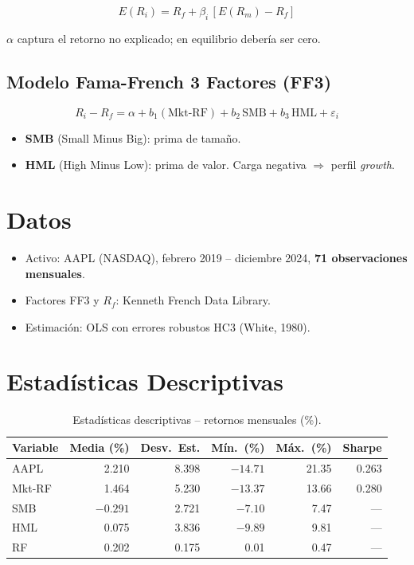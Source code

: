 \documentclass[12pt,letterpaper]{article}
\begin{document}
\begin{equation}
  E(R_i) = R_f + \beta_i\,[E(R_m) - R_f]
\end{equation}

$\alpha$ captura el retorno no explicado; en equilibrio deber\'ia ser cero.

\subsection{Modelo Fama-French 3 Factores (FF3)}

\begin{equation}
  R_i - R_f = \alpha + b_1(\text{Mkt-RF}) + b_2\,\text{SMB}
    + b_3\,\text{HML} + \varepsilon_i
\end{equation}

\begin{itemize}
  \item \textbf{SMB} (Small Minus Big): prima de tama\~no.
  \item \textbf{HML} (High Minus Low): prima de valor. Carga negativa
    $\Rightarrow$ perfil \textit{growth}.
\end{itemize}

\section{Datos}

\begin{itemize}
  \item Activo: AAPL (NASDAQ), febrero 2019 -- diciembre 2024,
    \textbf{71 observaciones mensuales}.
  \item Factores FF3 y $R_f$: Kenneth French Data Library.
  \item Estimaci\'on: OLS con errores robustos HC3 (White, 1980).
\end{itemize}

\section{Estad\'isticas Descriptivas}

\begin{table}[h!]
\centering
\begin{tabular}{@{}lrrrrr@{}}
\toprule
Variable & Media (\%) & Desv.\ Est. & M\'in.\ (\%) & M\'ax.\ (\%) & Sharpe \\
\midrule
AAPL   &  2.210 & 8.398 & $-14.71$ & 21.35 & 0.263 \\
Mkt-RF &  1.464 & 5.230 & $-13.37$ & 13.66 & 0.280 \\
SMB    & $-0.291$ & 2.721 & $-7.10$ & 7.47 & --- \\
HML    &  0.075 & 3.836 & $-9.89$  & 9.81 & --- \\
RF     &  0.202 & 0.175 & 0.01    & 0.47 & --- \\
\bottomrule
\end{tabular}
\caption{Estad\'isticas descriptivas -- retornos mensuales (\%).}
\end{table}
\end{document}
